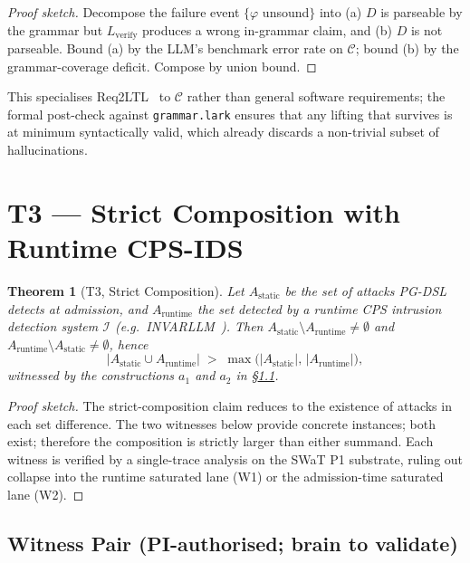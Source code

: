 \documentclass[11pt]{article}
\newtheorem{theorem}{Theorem}
\begin{document}
\begin{proof}[Proof sketch]
Decompose the failure event $\{\varphi$ unsound$\}$ into
(a) $D$ is parseable by the grammar but $L_{\text{verify}}$ produces a wrong
in-grammar claim, and (b) $D$ is not parseable. Bound (a) by the LLM's
benchmark error rate on $\mathcal{C}$; bound (b) by the grammar-coverage
deficit. Compose by union bound.
\end{proof}

This specialises Req2LTL~\cite{req2ltl2025} to $\mathcal{C}$ rather than
general software requirements; the formal post-check against
\texttt{grammar.lark} ensures that any lifting that survives is at minimum
syntactically valid, which already discards a non-trivial subset of
hallucinations.

\section{T3 --- Strict Composition with Runtime CPS-IDS}
\label{sec:t3}

\begin{theorem}[T3, Strict Composition]
\label{thm:t3}
Let $A_{\text{static}}$ be the set of attacks PG-DSL detects at admission,
and $A_{\text{runtime}}$ the set detected by a runtime CPS intrusion
detection system $\mathcal{I}$ (e.g.\ INVARLLM~\cite{invarllm2024}). Then
$A_{\text{static}} \setminus A_{\text{runtime}} \neq \emptyset$ and
$A_{\text{runtime}} \setminus A_{\text{static}} \neq \emptyset$, hence
\[
\big|A_{\text{static}} \cup A_{\text{runtime}}\big|
\;>\;
\max\big(|A_{\text{static}}|,\,|A_{\text{runtime}}|\big),
\]
witnessed by the constructions $a_1$ and $a_2$ in
\S\ref{sec:t3-witness}.
\end{theorem}

\begin{proof}[Proof sketch]
The strict-composition claim reduces to the existence of attacks in each
set difference. The two witnesses below provide concrete instances; both
exist; therefore the composition is strictly larger than either summand.
Each witness is verified by a single-trace analysis on the SWaT P1
substrate, ruling out collapse into the runtime saturated lane (W1) or the
admission-time saturated lane (W2).
\end{proof}

\subsection{Witness Pair (PI-authorised; brain to validate)}
\label{sec:t3-witness}
\end{document}
